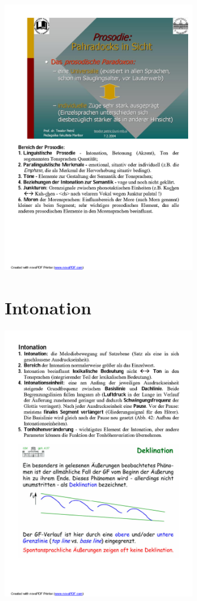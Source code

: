 \documentclass[
  letterpaper,
]{scrbook}
\begin{document}
\includegraphics[width=3.31in,height=\textheight]{./pictures/prosodie/06_Prosodie_Folie_2005-06_R_Page3.png}

\hypertarget{intonation}{%
\section{Intonation}\label{intonation}}

\includegraphics[width=3.31in,height=\textheight]{./pictures/prosodie/06_Prosodie_Folie_2005-06_R_Page4.png}
\end{document}
